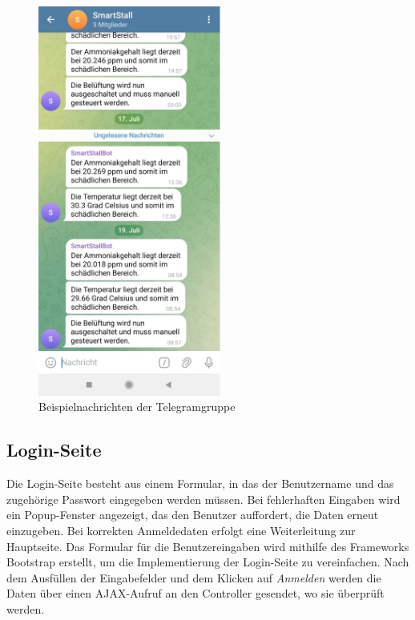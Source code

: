 \documentclass[conference]{IEEEtran}
\begin{document}
\begin{figure}[H]
	\centering
	\includegraphics[width=60mm]{fig/uiTelegram.jpg}
	\caption{Beispielnachrichten der Telegramgruppe}
	\label{telegram}
\end{figure}
\subsection{Login-Seite}
Die Login-Seite besteht aus einem Formular, in das der Benutzername und das zugehörige Passwort eingegeben werden müssen. Bei fehlerhaften Eingaben wird ein Popup-Fenster angezeigt, das den Benutzer auffordert, die Daten erneut einzugeben. Bei korrekten Anmeldedaten erfolgt eine Weiterleitung zur Hauptseite.
Das Formular für die Benutzereingaben wird mithilfe des Frameworks Bootstrap erstellt, um die Implementierung der Login-Seite zu vereinfachen. Nach dem Ausfüllen der Eingabefelder und dem Klicken auf \textit{Anmelden} werden die Daten über einen AJAX-Aufruf an den Controller gesendet, wo sie überprüft werden.
\end{document}
